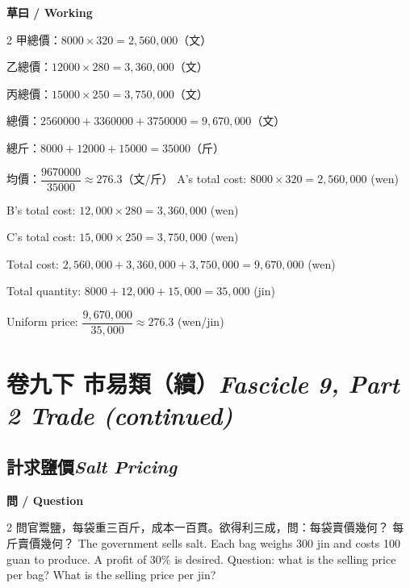 \documentclass[11pt,a4paper]{article}
\newcommand{\bilingualsection}[2]{\section{#1\hfill\textit{\small #2}}}
\newcommand{\bilingualsubsection}[2]{\subsection{#1\quad\textit{#2}}}
\begin{document}
\vspace{0.4em}
\noindent\textbf{\textcolor{chinesecolor}{草曰} / \textcolor{englishcolor}{Working}}
\vspace{0.2em}
\begin{paracol}{2}
甲總價：$8000 \times 320 = 2{,}560{,}000$（文）

乙總價：$12000 \times 280 = 3{,}360{,}000$（文）

丙總價：$15000 \times 250 = 3{,}750{,}000$（文）

總價：$2560000 + 3360000 + 3750000 = 9{,}670{,}000$（文）

總斤：$8000 + 12000 + 15000 = 35000$（斤）

均價：$\dfrac{9670000}{35000} \approx 276.3$（文/斤）
\switchcolumn
A's total cost: $8000 \times 320 = 2{,}560{,}000$ (wen)

B's total cost: $12{,}000 \times 280 = 3{,}360{,}000$ (wen)

C's total cost: $15{,}000 \times 250 = 3{,}750{,}000$ (wen)

Total cost: $2{,}560{,}000 + 3{,}360{,}000 + 3{,}750{,}000 = 9{,}670{,}000$ (wen)

Total quantity: $8000 + 12{,}000 + 15{,}000 = 35{,}000$ (jin)

Uniform price: $\dfrac{9{,}670{,}000}{35{,}000} \approx 276.3$ (wen/jin)
\end{paracol}

\newpage

\bilingualsection{卷九下 \quad 市易類（續）}{Fascicle 9, Part 2 \quad Trade (continued)}
\label{sec:fasc9b}

\bilingualsubsection{計求鹽價}{Salt Pricing}

\vspace{0.4em}
\noindent\textbf{\textcolor{chinesecolor}{問} / \textcolor{englishcolor}{Question}}
\vspace{0.3em}
\begin{paracol}{2}
問官鬻鹽，每袋重三百斤，成本一百貫。欲得利三成，問：每袋賣價幾何？
每斤賣價幾何？
\switchcolumn
The government sells salt. Each bag weighs 300 jin and costs 100 guan to
produce. A profit of 30\% is desired. Question: what is the selling price
per bag? What is the selling price per jin?
\end{paracol}
\end{document}

